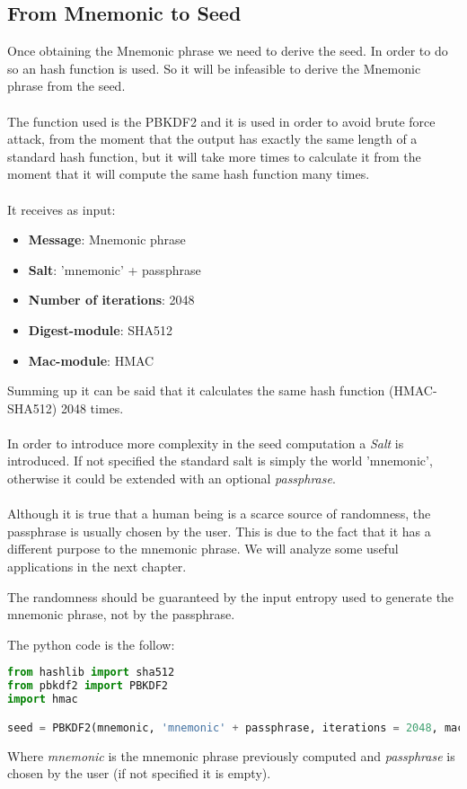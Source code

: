 \subsection{From Mnemonic to Seed}
Once obtaining the Mnemonic phrase we need to derive the seed. In order to do so an hash function is used. So it will be infeasible to derive the Mnemonic phrase from the seed.
\\ \\
The function used is the PBKDF2 and it is used in order to avoid brute force attack, from the moment that the output has exactly the same length of a standard hash function, but it will take more times to calculate it from the moment that it will compute the same hash function many times.
\\ \\
It receives as input:
\begin{itemize}[label=$\odot$]
	\item \textbf{Message}: Mnemonic phrase
	\item \textbf{Salt}: 'mnemonic' + passphrase
	\item \textbf{Number of iterations}: 2048
	\item \textbf{Digest-module}: SHA512
	\item \textbf{Mac-module}: HMAC
\end{itemize}
Summing up it can be said that it calculates the same hash function (HMAC-SHA512) 2048 times.
\\ \\
In order to introduce more complexity in the seed computation a \textit{Salt} is introduced. If not specified the standard salt is simply the world 'mnemonic', otherwise it could be extended with an optional \textit{passphrase}.
\\ \\
Although it is true that a human being is a scarce source of randomness, the passphrase is usually chosen by the user. This is due to the fact that it has a different purpose to the mnemonic phrase. We will analyze some useful applications in the next chapter. 
\begin{remark}
	The randomness should be guaranteed by the input entropy used to generate the mnemonic phrase, not by the passphrase.
\end{remark}
The python code is the follow:
\begin{lstlisting}[language=Python]
from hashlib import sha512
from pbkdf2 import PBKDF2
import hmac

seed = PBKDF2(mnemonic, 'mnemonic' + passphrase, iterations = 2048, macmodule = hmac, digestmodule = sha512).read(64)
\end{lstlisting}
Where \textit{mnemonic} is the mnemonic phrase previously computed and \textit{passphrase} is chosen by the user (if not specified it is empty).

